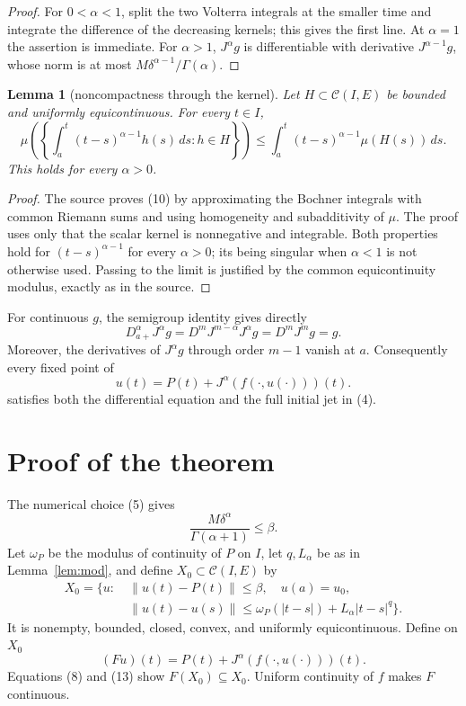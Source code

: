 \documentclass[11pt]{article}
\newtheorem{lemma}[theorem]{Lemma}
\newcommand{\C}{\mathcal C}
\newcommand{\Ga}{\Gamma}
\begin{document}
\begin{proof}
For $0<\alpha<1$, split the two Volterra integrals at the smaller time and
integrate the difference of the decreasing kernels; this gives the first
line.  At $\alpha=1$ the assertion is immediate.  For $\alpha>1$,
$J^\alpha g$ is differentiable with derivative $J^{\alpha-1}g$, whose norm is
at most $M\delta^{\alpha-1}/\Ga(\alpha)$.
\end{proof}

\begin{lemma}[noncompactness through the kernel]\label{lem:mnc}
Let $H\subset\C(I,E)$ be bounded and uniformly equicontinuous.  For every
$t\in I$,
\[
 \mu\left(\left\{\int_a^t(t-s)^{\alpha-1}h(s)\,ds:h\in H\right\}\right)
 \leq\int_a^t(t-s)^{\alpha-1}\mu(H(s))\,ds.                 \tag{10}
\]
This holds for every $\alpha>0$.
\end{lemma}

\begin{proof}
The source proves (10) by approximating the Bochner integrals with common
Riemann sums and using homogeneity and subadditivity of $\mu$.  The proof uses
only that the scalar kernel is nonnegative and integrable.  Both properties
hold for $(t-s)^{\alpha-1}$ for every $\alpha>0$; its being singular when
$\alpha<1$ is not otherwise used.  Passing to the limit is justified by the
common equicontinuity modulus, exactly as in the source.
\end{proof}

For continuous $g$, the semigroup identity gives directly
\[
 D_{a+}^{\alpha}J^\alpha g
 =D^mJ^{m-\alpha}J^\alpha g=D^mJ^m g=g.                     \tag{11}
\]
Moreover, the derivatives of $J^\alpha g$ through order $m-1$ vanish at
$a$.  Consequently every fixed point of
\[
 u(t)=P(t)+J^\alpha(f(\cdot,u(\cdot)))(t).                  \tag{12}
\]
satisfies both the differential equation and the full initial jet in (4).

\section{Proof of the theorem}

The numerical choice (5) gives
\[
 \frac{M\delta^\alpha}{\Ga(\alpha+1)}\leq\beta.            \tag{13}
\]
Let $\omega_P$ be the modulus of continuity of $P$ on $I$, let $q,L_\alpha$
be as in Lemma~\ref{lem:mod}, and define $X_0\subset\C(I,E)$ by
\[
 \begin{split}
 X_0=\{u:\ &\|u(t)-P(t)\|\leq\beta,\quad u(a)=u_0,\\
 &\|u(t)-u(s)\|\leq\omega_P(|t-s|)+L_\alpha|t-s|^q\}.
 \end{split}                                                  \tag{14}
\]
It is nonempty, bounded, closed, convex, and uniformly equicontinuous.  Define
on $X_0$
\[
 (Fu)(t)=P(t)+J^\alpha(f(\cdot,u(\cdot)))(t).                \tag{15}
\]
Equations (8) and (13) show $F(X_0)\subseteq X_0$.  Uniform continuity of
$f$ makes $F$ continuous.
\end{document}

